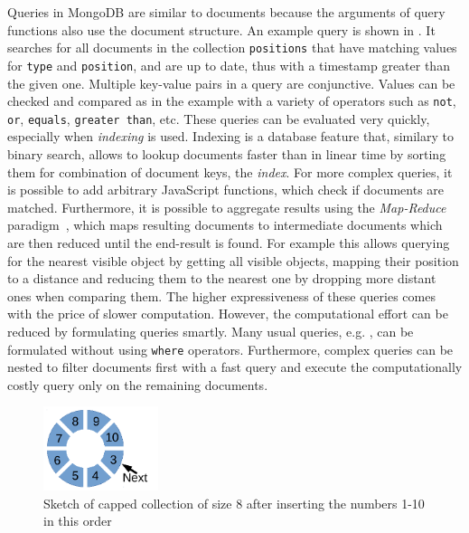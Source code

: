 Queries in MongoDB are similar to documents because the arguments of
query functions also use the document structure. An example query is shown
in . It searches for all documents in the
collection \texttt{positions} that have matching values for
\texttt{type} and \texttt{position}, and are up to date, thus with a
timestamp greater than the given one. Multiple key-value pairs in a
query are conjunctive.  Values can be checked and compared as in the
example with a variety of operators such as \texttt{not}, \texttt{or},
\texttt{equals}, \texttt{greater than}, etc. These queries can be
evaluated very quickly, especially when \emph{indexing} is
used. Indexing is a
database feature that, similary to binary search, allows to lookup
documents faster than in linear time by sorting them for combination of document
keys, the \emph{index}. For more complex queries, it is possible to add arbitrary
JavaScript functions, which check if documents are matched.
Furthermore, it is possible to aggregate
results using the \emph{Map-Reduce} paradigm~\cite{mapreduce}, which
maps resulting documents to intermediate documents which are then
reduced until the end-result is found. For example this allows
querying for the nearest visible object by getting all visible
objects, mapping their position to a distance and reducing them to the
nearest one by dropping more distant ones when comparing them. The
higher expressiveness of these queries comes with the price of slower
computation. However, the computational effort can be reduced by
formulating queries smartly. Many usual queries,
e.g. , can be formulated without using
\texttt{where} operators. Furthermore, complex queries can be nested to
filter documents first with a fast query and execute the
computationally costly query only on the remaining documents.
\begin{figure}
  \centering
  \vspace{-5mm}
  \includegraphics[width=0.3\textwidth]{draw/capped-collection}%
  \caption[Sketch of capped collection of size 8 after inserting the numbers 1-10 in
  this order]{Sketch of capped collection of size 8 after inserting the numbers 1-10 in
  this order}
  \vspace{-3mm}
  \label{fig:capped-collection}
\end{figure}
